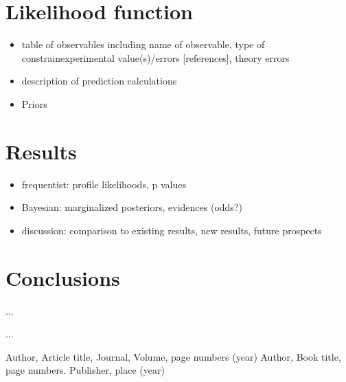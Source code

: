 \section{Likelihood function}
\label{lnL}

\begin{itemize}
  \item table of observables including name of observable, type of
             constrainexperimental value(s)/errors [references], theory errors
  \item description of prediction calculations
  \item Priors
\end{itemize}


\section{Results}
\label{examples}

\begin{itemize}
  \item frequentist: profile likelihoods, p values
  \item Bayesian: marginalized posteriors, evidences (odds?)
  \item discussion: comparison to existing results, new results, future prospects
\end{itemize}


\section{Conclusions}
\label{conc}

...



\begin{acknowledgements}
...
\end{acknowledgements}




\begin{thebibliography}{}
%
%
Author, Article title, Journal, Volume, page numbers (year)
Author, Book title, page numbers. Publisher, place (year)
\end{thebibliography}




